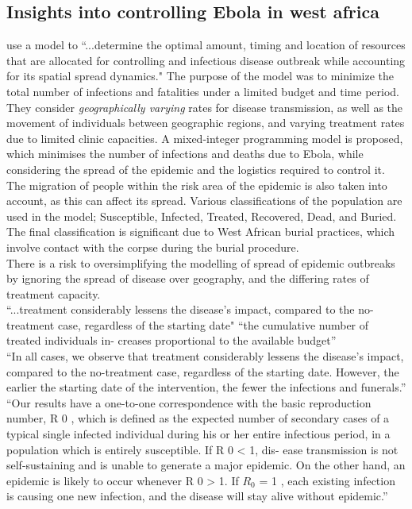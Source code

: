 
\subsection{Insights into controlling Ebola in west africa}
\cite{buyuktahtakin2018new} use a model to ``...determine the optimal amount, timing and location of resources that are allocated for controlling and infectious disease outbreak while accounting for its spatial spread dynamics." The purpose of the model was to minimize the total number of infections and fatalities under a limited budget and time period. They consider \emph{geographically varying} rates for disease transmission, as well as the movement of individuals between geographic regions, and varying treatment rates due to limited clinic capacities. A mixed-integer programming model is proposed, which minimises the number of infections and deaths due to Ebola, while considering the spread of the epidemic and the logistics required to control it. The migration of people within the risk area of the epidemic is also taken into account, as this can affect its spread.  Various classifications of the population are used in the model; Susceptible, Infected, Treated, Recovered, Dead, and Buried. The final classification is significant due to West African burial practices, which involve contact with the corpse during the burial procedure. \\
There is a risk to oversimplifying the modelling of spread of epidemic outbreaks by ignoring the spread of disease over geography, and the differing rates of treatment capacity. \cite[p.~2]{buyuktahtakin2018new} \\
``...treatment considerably lessens the disease’s impact, compared to the no-treatment case, regardless of the starting date"
``the cumulative number of treated individuals in- creases proportional to the available budget” \\
``In all cases, we observe that treatment considerably lessens the disease’s impact, compared to the no-treatment case, regardless of the starting date. However, the earlier the starting date of the intervention, the fewer the infections and funerals.” \\
``Our results have a one-to-one correspondence with the basic reproduction number, R 0 , which is defined as the expected number of secondary cases of a typical single infected individual during his or her entire infectious period, in a population which is entirely susceptible. If R 0 < 1, dis- ease transmission is not self-sustaining and is unable to generate a major epidemic. On the other hand, an epidemic is likely to occur whenever R 0 > 1. If $R_{0}$ = 1 , each existing infection is causing one new infection, and the disease will stay alive without epidemic.” \\
